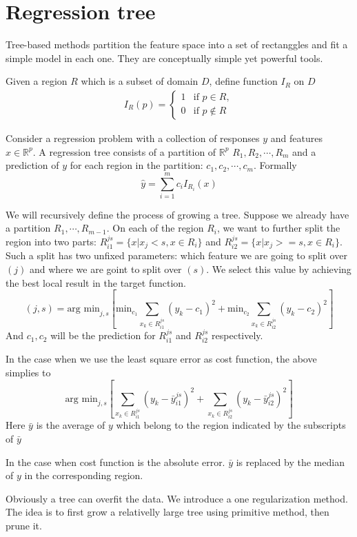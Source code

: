 \documentclass{article}
\author{Yinan Zhu}
\begin{document}
\section{Regression tree}
Tree-based methods partition the feature space into a set of rectanggles and fit a simple model in each one. They are conceptually simple yet powerful tools.

Given a region $R$ which is a subset of domain $D$, define function $I_R$ on $D$ 
\begin{eqnarray}
I_R(p)= \left\{
\begin{array}{rl}
1 & \textrm{if } p \in R,\\
0 & \textrm{if } p \notin R
\end{array} \right.\nonumber
\end{eqnarray}

Consider a regression problem with a collection of responses $y$ and features $x\in \mathbb{R}^p$. A regression tree consists of a partition of $\mathbb{R}^p$ $R_1, R_2,\cdots,R_m$ and a prediction of $y$ for each region in the partition: $c_1,c_2,\cdots,c_m$. Formally
\[
\hat{y}=\sum_{i=1}^m c_iI_{R_i}(x)
\]

We will recursively define the process of growing a tree. Suppose we already have a partition $R_1,\cdots, R_{m-1}$. On each of the region $R_i$, we want to further split the region into two parts: $R_{i1}^{js}=\{x|x_j<s,x\in R_i\}$ and $R_{i2}^{js}=\{x|x_j>=s,x\in R_i\}$. Such a split has two unfixed parameters: which feature we are going to split over $(j)$ and where we are goint to split over $(s)$. We select this value by achieving the best local result in the target function.
\[
(j,s)=\textrm{arg min}_{j,s}[\textrm{min}_{c_1}\sum_{x_k\in R_{i1}^{js}}(y_k-c_1)^2+\textrm{min}_{c_2}\sum_{x_k\in R_{i2}^{js}}(y_k-c_2)^2]
\]
And $c_1, c_2$ will be the prediction for $R_{i1}^{js}$ and $R_{i2}^{js}$ respectively.

In the case when we use the least square error as cost function, the above simplies to
\[
\textrm{arg min}_{j,s}[\sum_{x_k\in R_{i1}^{js}}(y_k-\bar{y}_{i1}^{js})^2+\sum_{x_k\in R_{i2}^{js}}(y_k-\bar{y}_{i2}^{js})^2]\nonumber
\]
Here $\bar{y}$ is the average of $y$ which belong to the region indicated by the subscripts of $\bar{y}$

In the case when cost function is the absolute error. $\bar{y}$ is replaced by the median of $y$ in the corresponding region.

Obviously a tree can overfit the data. We introduce a one regularization method. The idea is to first grow a relativelly large tree using primitive method, then prune it. 
\end{document}
